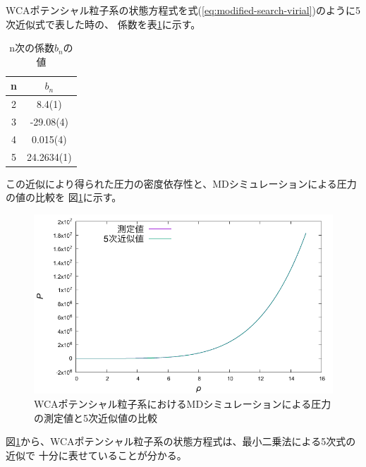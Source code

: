 \documentclass[titlepage]{jsreport}
\begin{document}
{{{WCAポテンシャル粒子系の状態方程式を式(\ref{eq:modified-search-virial})のように5次近似式で表した時の、
係数を表\ref{table:5-coefficient}に示す。

\begin{table}[htbp]
    \begin{center}
        \caption{n次の係数$b_n$の値}
        \label{table:5-coefficient}
            \begin{tabular}{c c}
                    n & $b_n$ \\ \hline\hline
                    2 & 8.4(1) \\ 
                    3 & -29.08(4) \\ 
                    4 & 0.015(4)\\ 
                    5 & 24.2634(1)\\ \hline
                
            \end{tabular}
    \end{center}
    
\end{table}

\newpage
この近似により得られた圧力の密度依存性と、MDシミュレーションによる圧力の値の比較を
図\ref{fig:5den-pre}に示す。

\begin{figure}[htbp]
    \begin{center}
        \includegraphics[width=14cm]{fig/5den-pre.pdf}
    \end{center}
    \caption{WCAポテンシャル粒子系におけるMDシミュレーションによる圧力の測定値と5次近似値の比較}
    \label{fig:5den-pre}
\end{figure}

図\ref{fig:5den-pre}から、WCAポテンシャル粒子系の状態方程式は、最小二乗法による5次式の近似で
十分に表せていることが分かる。


}}}
\end{document}
